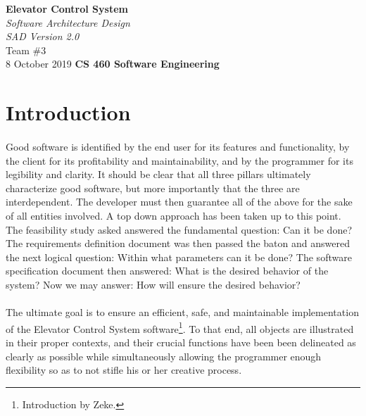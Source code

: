 \documentclass[12pt]{article}
\begin{document}
\begin{titlepage}
	\begin{flushleft}
		\vspace{1cm} \Huge  \textbf{Elevator Control System}\\
		\vspace{1cm} \Huge  \textit{Software Architecture Design}\\
		\vspace{1cm} \Large \textit{SAD Version 2.0}\\
		\vspace{5cm} \LARGE         Team \#3\\ 
		                            8 October 2019
		\vfill       \Huge  \textbf{CS 460 Software Engineering}
	\end{flushleft}
\end{titlepage}
\normalsize 
\tableofcontents
\pagebreak

\section{Introduction} \label{intro}
\paragraph{} Good software is identified by the end user for its features and functionality, by the client
for its profitability and maintainability, and by the programmer for its legibility and clarity. It should be clear
that all three pillars ultimately characterize good software, but more importantly that the three are interdependent.
The developer must then guarantee all of the above for the sake of all entities involved. A top down approach has been
taken up to this point. The feasibility study asked answered the fundamental question: Can it be done? The requirements
definition document was then passed the baton and answered the next logical question: Within what parameters can it be done?
The software specification document then answered: What is the desired behavior of the system? Now we may answer: 
How will ensure the desired behavior?

\paragraph{} The ultimate goal is to ensure an efficient, safe, and maintainable implementation of the 
Elevator Control System software\footnote{ Introduction by Zeke.}. To that end, all objects are illustrated in their proper contexts, and
their crucial functions have been been delineated as clearly as possible while simultaneously allowing 
the programmer enough flexibility so as to not stifle his or her creative process. 
\end{document}
